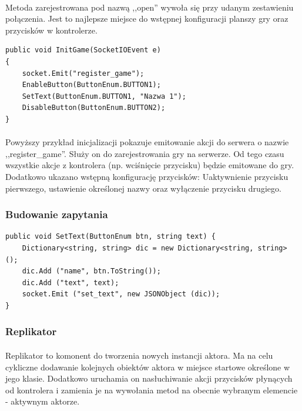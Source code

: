 \paragraph{}
Metoda zarejestrowana pod nazwą ,,open'' wywoła się przy udanym zestawieniu połączenia. Jest to najlepsze miejsce do wstępnej konfiguracji planszy gry oraz przycisków w kontrolerze.

\begin{lstlisting}[language=CSharp]
public void InitGame(SocketIOEvent e)
{
	socket.Emit("register_game");
	EnableButton(ButtonEnum.BUTTON1);
	SetText(ButtonEnum.BUTTON1, "Nazwa 1");
	DisableButton(ButtonEnum.BUTTON2);
}
\end{lstlisting}

\paragraph{}
Powyższy przykład inicjalizacji pokazuje emitowanie akcji do serwera o nazwie ,,register\_game''. Służy on do zarejestrowania gry na serwerze. Od tego czasu wszystkie akcje z kontrolera (np. wciśnięcie przycisku) będzie emitowane do gry.
Dodatkowo ukazano wstępną konfigurację przycisków: Uaktywnienie przycisku pierwszego, ustawienie określonej nazwy oraz wyłączenie przycisku drugiego.

\subsubsection{Budowanie zapytania}

\begin{lstlisting}[language=CSharp]
public void SetText(ButtonEnum btn, string text) {
	Dictionary<string, string> dic = new Dictionary<string, string> ();
	dic.Add ("name", btn.ToString());
	dic.Add ("text", text);
	socket.Emit ("set_text", new JSONObject (dic));
}
\end{lstlisting}

\subsubsection{Replikator}
\paragraph{}
Replikator to komonent do tworzenia nowych instancji aktora. Ma na celu cykliczne dodawanie kolejnych obiektów aktora w miejsce startowe określone w jego klasie. Dodatkowo uruchamia on nasłuchiwanie akcji przycisków płynących od kontrolera i zamienia je na wywołania metod na obecnie wybranym elemencie - aktywnym aktorze.


